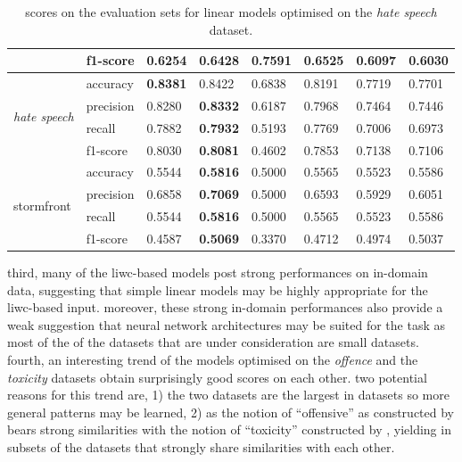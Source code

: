 \begin{table}[]
\begin{minipage}{0.42\paperheight}
{\begin{tabular}{ll|ll|ll|ll}
                                           & f1-score  & 0.6254       & 0.6428           & \bf{0.7591} & 0.6525        & 0.6097      & 0.6030      \\ \hline
    \multirow{4}{*}{\textit{hate speech}}  & accuracy  & \bf{0.8381}  & 0.8422           & 0.6838      & 0.8191        & 0.7719      & 0.7701      \\
                                           & precision & 0.8280       & \bf{0.8332}      & 0.6187      & 0.7968        & 0.7464      & 0.7446      \\
                                           & recall    & 0.7882       & \bf{0.7932}      & 0.5193      & 0.7769        & 0.7006      & 0.6973      \\
                                           & f1-score  & 0.8030       & \bf{0.8081}      & 0.4602      & 0.7853        & 0.7138      & 0.7106      \\ \hline
    \multirow{4}{*}{stormfront}            & accuracy  & 0.5544       & \bf{0.5816}      & 0.5000      & 0.5565        & 0.5523      & 0.5586      \\
                                           & precision & 0.6858       & \bf{0.7069}      & 0.5000      & 0.6593        & 0.5929      & 0.6051      \\
                                           & recall    & 0.5544       & \bf{0.5816}      & 0.5000      & 0.5565        & 0.5523      & 0.5586      \\
                                           & f1-score  & 0.4587       & \bf{0.5069}      & 0.3370      & 0.4712        & 0.4974      & 0.5037
    \end{tabular}%
    }
    \caption{scores on the evaluation sets for linear models optimised on the \textit{hate speech} dataset.}
    \label{tab:linear_hatespeech_baselines}
\end{minipage}
\end{table}

third, many of the liwc-based models post strong performances on in-domain data, suggesting that simple linear models may be highly appropriate for the liwc-based input.
moreover, these strong in-domain performances also provide a weak suggestion that neural network architectures may be suited for the task as most of the of the datasets that are under consideration are small datasets.
fourth, an interesting trend of the models optimised on the \textit{offence} and the \textit{toxicity} datasets obtain surprisingly good scores on each other. 
two potential reasons for this trend are, 1) the two datasets are the largest in datasets so more general patterns may be learned, 2) as the notion of ``offensive'' as constructed by \citet{davidson:2017} bears strong similarities with the notion of ``toxicity'' constructed by \citet{wulczyn:2017}, yielding in subsets of the datasets that strongly share similarities with each other.

